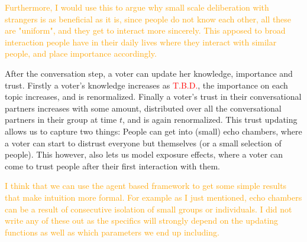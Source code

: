 \textcolor{orange}{
Furthermore, I would use this to argue why small scale deliberation with strangers is as beneficial as it is, since people do not know each other, all these are "uniform", and they get to interact more sincerely. This apposed to broad interaction people have in their daily lives where they interact with similar people, and place importance accordingly.
}

After the conversation step, a voter can update her knowledge, importance and trust. Firstly a voter's knowledge increases as \textcolor{red}{T.B.D.}, the importance on each topic increases, and is renormalized. Finally a voter's trust in their conversational partners increases with some amount, distributed over all the conversational partners in their group at time $t$, and is again renormalized. This trust updating allows us to capture two things: People can get into (small) echo chambers, where a voter can start to distrust everyone but themselves (or a small selection of people). This however, also lets us model exposure effects, where a voter can come to trust people after their first interaction with them.

\textcolor{orange}{
	I think that we can use the agent based framework to get some simple results that make intuition more formal. For example as I just mentioned, echo chambers can be a result of consecutive isolation of small groups or individuals. I did not write any of these out as the specifics will strongly depend on the updating functions as well as which parameters we end up including. 
}
